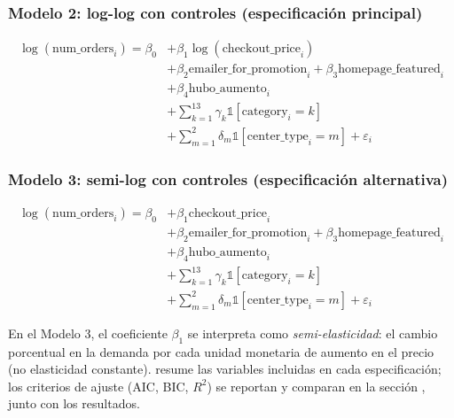 \documentclass[doc, a4paper, biblatex, floatsintext, longtable, babel]{apa7}
\begin{document}
\subsubsection{Modelo 2: log-log con controles (especificaci\'on principal)}
\begin{equation}
\begin{aligned}
\log(\text{num\_orders}_i) = \beta_0 &+ \beta_1 \log(\text{checkout\_price}_i) \\
&+ \beta_2 \text{emailer\_for\_promotion}_i + \beta_3 \text{homepage\_featured}_i \\
&+ \beta_4 \text{hubo\_aumento}_i \\
&+ \sum_{k=1}^{13} \gamma_k \mathbb{1}[\text{category}_i = k] \\
&+ \sum_{m=1}^{2} \delta_m \mathbb{1}[\text{center\_type}_i = m] + \varepsilon_i
\end{aligned}
\label{eq:modelo-2}
\end{equation}

\subsubsection{Modelo 3: semi-log con controles (especificaci\'on alternativa)}
\begin{equation}
\begin{aligned}
\log(\text{num\_orders}_i) = \beta_0 &+ \beta_1 \text{checkout\_price}_i \\
&+ \beta_2 \text{emailer\_for\_promotion}_i + \beta_3 \text{homepage\_featured}_i \\
&+ \beta_4 \text{hubo\_aumento}_i \\
&+ \sum_{k=1}^{13} \gamma_k \mathbb{1}[\text{category}_i = k] \\
&+ \sum_{m=1}^{2} \delta_m \mathbb{1}[\text{center\_type}_i = m] + \varepsilon_i
\end{aligned}
\label{eq:modelo-3}
\end{equation}

En el Modelo 3, el coeficiente $\beta_1$ se interpreta como \textit{semi-elasticidad}: el cambio porcentual en la demanda por cada unidad monetaria de aumento en el precio (no elasticidad constante).  resume las variables incluidas en cada especificaci\'on; los criterios de ajuste (AIC, BIC, $R^2$) se reportan y comparan en la secci\'on , junto con los resultados.
\end{document}
